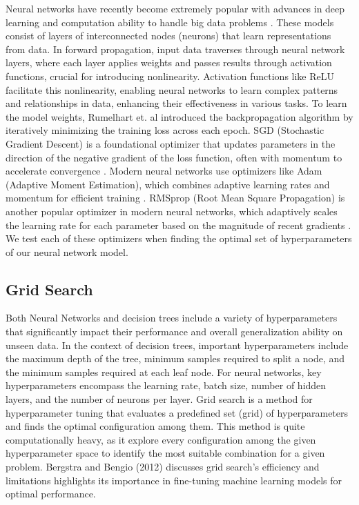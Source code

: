 \documentclass[conference]{IEEEtran}
\begin{document}
Neural networks have recently become extremely popular with advances in deep learning and computation ability to handle big data problems \cite{LeCun}. These models consist of layers of interconnected nodes (neurons) that learn representations from data. In forward propagation, input data traverses through neural network layers, where each layer applies weights and passes results through activation functions, crucial for introducing nonlinearity. Activation functions like ReLU facilitate this nonlinearity, enabling neural networks to learn complex patterns and relationships in data, enhancing their effectiveness in various tasks. To learn the model weights, Rumelhart et. al \cite{Rumelhart} introduced the backpropagation algorithm by iteratively minimizing the training loss across each epoch. SGD (Stochastic Gradient Descent) is a foundational optimizer that updates parameters in the direction of the negative gradient of the loss function, often with momentum to accelerate convergence \cite{Bottou}. Modern neural networks use optimizers like Adam (Adaptive Moment Estimation), which combines adaptive learning rates and momentum for efficient training \cite{Kingma}. RMSprop (Root Mean Square Propagation) is another popular optimizer in modern neural networks, which adaptively scales the learning rate for each parameter based on the magnitude of recent gradients \cite{Tieleman}. We test each of these optimizers when finding the optimal set of hyperparameters of our neural network model. 

\subsection{Grid Search}

Both Neural Networks and decision trees include a variety of hyperparameters that significantly impact their performance and overall generalization ability on unseen data. In the context of decision trees, important hyperparameters include the maximum depth of the tree, minimum samples required to split a node, and the minimum samples required at each leaf node. For neural networks, key hyperparameters encompass the learning rate, batch size, number of hidden layers, and the number of neurons per layer. Grid search is a method for hyperparameter tuning that evaluates a predefined set (grid) of hyperparameters and finds the optimal configuration among them. This method is quite computationally heavy, as it explore every configuration among the given hyperparameter space to identify the most suitable combination for a given problem. Bergstra and Bengio (2012) \cite{Bergstra} discusses grid search's efficiency and limitations highlights its importance in fine-tuning machine learning models for optimal performance.
\end{document}
